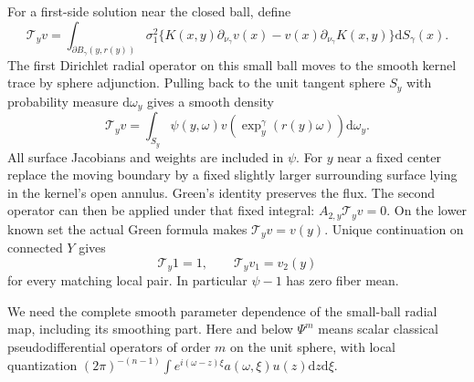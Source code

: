 \documentclass[11pt]{article}
\theoremstyle{definition}\newtheorem{definition}[theorem]{Definition}
\theoremstyle{remark}\newtheorem{remark}[theorem]{Remark}
\newcommand{\dd}{\mathrm d}
\begin{document}
For a first-side solution near the closed ball, define
\begin{equation}\label{eq:flux}
 \mathcal T_yv=\int_{\partial B_\gamma(y,r(y))}\!
 \sigma_1^2\{K(x,y)\partial_{\nu_\gamma}v(x)
                   -v(x)\partial_{\nu_\gamma}K(x,y)\}\dd S_\gamma(x).
\end{equation}
The first Dirichlet radial operator on this small ball moves to the smooth
kernel trace by sphere adjunction. Pulling back to the unit tangent sphere
$S_y$ with probability measure $\dd\omega_y$ gives a smooth density
\begin{equation}\label{eq:density}
 \mathcal T_yv=\int_{S_y}\psi(y,\omega)
            v(\exp_y^\gamma(r(y)\omega))\dd\omega_y.
\end{equation}
All surface Jacobians and weights are included in $\psi$.
For $y$ near a fixed center replace the moving boundary by a fixed slightly
larger surrounding surface lying in the kernel's open annulus. Green's
identity preserves the flux. The second operator can then be applied
under that fixed integral: $A_{2,y}\mathcal T_yv=0$.
On the lower known set the actual Green formula makes $\mathcal T_yv=v(y)$.
Unique continuation on connected $Y$ gives
\begin{equation}\label{eq:transfer}
 \mathcal T_y1=1,\qquad\mathcal T_yv_1=v_2(y)
\end{equation}
for every matching local pair. In particular $\psi-1$ has zero fiber mean.

We need the complete smooth parameter dependence of the small-ball radial
map, including its smoothing part. Here and below $\Psi^m$ means scalar
classical pseudodifferential operators of order $m$ on the unit sphere,
with local quantization
$(2\pi)^{-(n-1)}\int e^{i(\omega-z)\xi}a(\omega,\xi)u(z)\dd z\dd\xi$.
\end{document}

